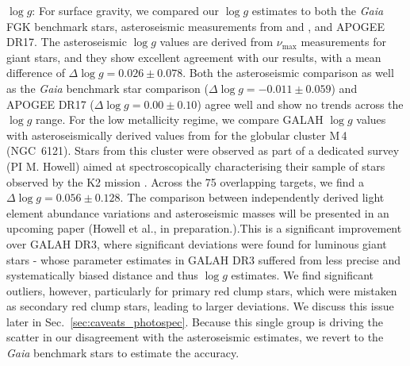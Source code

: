 \documentclass[
  journal=pasa,
  manuscript=research-paper, %
  year=2024,
  volume=37
]{cup-journal}
\newcommand{\logg}{$\log g$\xspace}
\newcommand{\Gaia}{\textit{Gaia}\xspace}
\begin{document}
\logg: For surface gravity, we compared our \logg estimates to both the \Gaia FGK benchmark stars, asteroseismic measurements from \citet{Zinn2020} and \citet{Hon2021}, and APOGEE DR17. The asteroseismic \logg values are derived from $\nu_\mathrm{max}$ measurements for giant stars, and they show excellent agreement with our results, with a mean difference of $\Delta \log g = 0.026 \pm 0.078$. Both the asteroseismic comparison as well as the \Gaia benchmark star comparison ($\Delta \log g = -0.011 \pm 0.059$) and APOGEE DR17 ($\Delta \log g = 0.00 \pm 0.10$) agree well and show no trends across the \logg range. For the low metallicity regime, we compare GALAH \logg values with asteroseismically derived values from \cite{Howell2022} for the globular cluster M\,4 (NGC~6121). Stars from this cluster were observed as part of a dedicated survey (PI M. Howell) aimed at spectroscopically characterising their sample of stars observed by the K2 mission \citep{Howell2014}. Across the 75 overlapping targets, we find a $\Delta \log g = 0.056 \pm 0.128$. The comparison between independently derived light element abundance variations and asteroseismic masses will be presented in an upcoming paper (Howell et al., in preparation.).This is a significant improvement over GALAH DR3, where significant deviations were found for luminous giant stars - whose parameter estimates in GALAH DR3 suffered from less precise and systematically biased distance and thus \logg estimates. We find significant outliers, however, particularly for primary red clump stars, which were mistaken as secondary red clump stars, leading to larger deviations. We discuss this issue later in Sec.~\ref{sec:caveats_photospec}. Because this single group is driving the scatter in our disagreement with the asteroseismic estimates, we revert to the \Gaia benchmark stars to estimate the accuracy.
\end{document}
